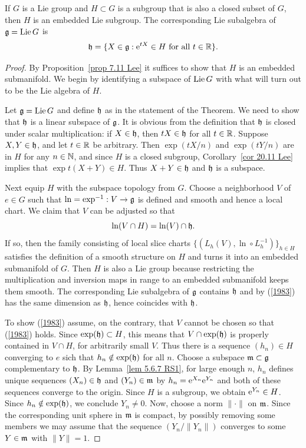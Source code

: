 \begin{thm}\label{thm closed subgroup}
    If $G$ is a Lie group and $H\subset G$ is a subgroup that is also a closed subset of $G$, then $H$ is an embedded Lie subgroup. The corresponding Lie subalgebra of $\mathfrak{g}=\operatorname{Lie} G$ is 
    \[\mathfrak{h}=\{X\in\mathfrak{g}: \mathrm{e}^{tX}\in H \text{ for all }t\in\mathbb{R}\}.\]
\end{thm}
\begin{proof}
    By Proposition~\ref{prop 7.11 Lee} it suffices to show that $H$ is an embedded submanifold. We begin by identifying a subspace of $\operatorname{Lie} G$ with what will turn out to be the Lie algebra of $H$.

    Let $\mathfrak{g}=\operatorname{Lie} G$ and define $\mathfrak{h}$ as in the statement of the Theorem. We need to show that $\mathfrak{h}$ is a linear subspace of $\mathfrak{g}$. It is obvious from the definition that $\mathfrak{h}$ is closed under scalar multiplication: if $X\in\mathfrak{h}$, then $tX\in\mathfrak{h}$ for all $t\in \mathbb{R}$. Suppose $X,Y\in\mathfrak{h}$, and let $t \in\mathbb{R}$ be arbitrary. Then $\exp(tX/n)$ and $\exp(tY/n)$ are in $H$ for any $n\in \mathbb{N}$, and since $H$ is a closed subgroup, Corollary~\ref{cor 20.11 Lee} implies that $\exp t(X+Y)\in H$. Thus $X+Y\in\mathfrak{h}$ and $\mathfrak{h}$ is a subspace.

    Next equip $H$ with the subspace topology from $G$. Choose a neighborhood $V$ of $e\in G$ such that $\ln=\exp^{-1}:V\to \mathfrak{g}$ is defined and smooth and hence a local chart. We claim that $V$ can be adjusted so that 
    \[\ln(V\cap H)=\ln(V)\cap \mathfrak{h}.\label{1983}\]
    If so, then the family consisting of local slice charts $\{(L_h(V),\ln\circ L_{h}^{-1})\}_{h\in H}$ satisfies the definition of a smooth structure on $H$ and turns it into an embedded submanifold of $G$. Then $H$ is also a Lie group because restricting the multiplication and inversion maps in range to an embedded submanifold keeps them smooth. The corresponding Lie subalgebra of $\mathfrak{g}$ contains $\mathfrak{h}$ and by (\ref{1983}) has the same dimension as $\mathfrak{h}$, hence coincides with $\mathfrak{h}$.

    To show (\ref{1983}) assume, on the contrary, that $V$ cannot be chosen so that (\ref{1983}) holds. Since $\exp(\mathfrak{h})\subset H$, this means that $V\cap \exp(\mathfrak{h})$ is properly contained in $V\cap H$, for arbitrarily small $V$. Thus there is a sequence $(h_n)\in H$ converging to $e$ sich that $h_n\notin \exp(\mathfrak{h})$ for all $n$. Choose a subspace $\mathfrak{m}\subset\mathfrak{g}$ complementary to $\mathfrak{h}$. By Lemma~\ref{lem 5.6.7 RS1}, for large enough $n$, $h_n$ defines unique sequences $(X_n)\in \mathfrak{h}$ and $(Y_n)\in \mathfrak{m}$ by $h_n=\mathrm{e}^{X_n}\mathrm{e}^{Y_n}$ and both of these sequences converge to the origin. Since $H$ is a subgroup, we obtain $\mathrm{e}^{Y_n}\in H$. Since $h_n\notin\exp(\mathfrak{h})$, we conclude $Y_n\neq 0$. Now, choose a norm $\lVert\cdot\rVert$ on $\mathfrak{m}$. Since the corresponding unit sphere in $\mathfrak{m}$ is compact, by possibly removing some members we may assume that the sequence $(Y_n/\lVert Y_n\rVert)$ converges to some $Y\in\mathfrak{m}$ with $\lVert Y\rVert=1$. 
    

\end{proof}
